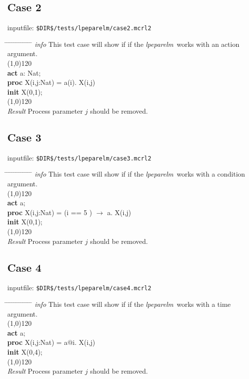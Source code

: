 \documentclass[a4paper,10pt]{article}
\theoremstyle{plain}
\theoremstyle{definition}
\newcommand{\tool}{\textit{lpeparelm}}
\newcommand{\ti}{\textit}
\newcommand{\tb}{\textbf}
\newcommand{\tabw}{\hspace*{15.mm} \= \hspace*{20.mm} \= \hspace*{5.mm} \= \hspace*{5.mm} \= \hspace*{5.mm} \= \hspace*{5.mm}  \= \hspace*{5.mm}  \= \hspace*{5.mm}  \= \hspace*{5.mm} \= \hspace*{5.mm} \= \hspace*{5.mm}  \= \hspace*{5.mm}  \= \hspace*{5.mm}\kill}
\begin{document}
\subsection*{Case 2}
inputfile: \verb"$DIR$/tests/lpeparelm/case2.mcrl2"
\begin{tabbing}
\tabw
\ti{info} \> This test case will show if if the \tool\ works with an action argument.\\
\line(1,0){120}\\
\tb{act} \> a: Nat; \\
\tb{proc} \> X(i,j:Nat) = \> a(i). X(i,j)\\
\tb{init} \> X(0,1); \\  
\line(1,0){120}\\
\ti{Result} \> Process parameter $j$ should be removed.\\ 
\end{tabbing}

\subsection*{Case 3}
inputfile: \verb"$DIR$/tests/lpeparelm/case3.mcrl2"
\begin{tabbing}
\tabw
\ti{info} \> This test case will show if if the \tool\ works with a condition argument.\\
\line(1,0){120}\\
\tb{act} \> a; \\
\tb{proc} \> X(i,j:Nat) = \> (i == 5 ) $\rightarrow$ a. X(i,j)\\
\tb{init} \> X(0,1); \\  
\line(1,0){120}\\
\ti{Result} \> Process parameter $j$ should be removed.\\ 
\end{tabbing}

\subsection*{Case 4}
inputfile: \verb"$DIR$/tests/lpeparelm/case4.mcrl2"
\begin{tabbing}
\tabw
\ti{info} \> This test case will show if if the \tool\ works with a time argument.\\
\line(1,0){120}\\
\tb{act} \> a; \\
\tb{proc} \> X(i,j:Nat) = \> a$@$i. X(i,j)\\
\tb{init} \> X(0,4); \\  
\line(1,0){120}\\
\ti{Result} \> Process parameter $j$ should be removed.\\ 
\end{tabbing}
\end{document}
